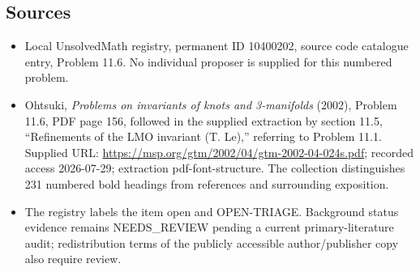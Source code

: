 \documentclass[11pt]{article}
\begin{document}
\subsection{Sources}
\begin{itemize}
\item Local UnsolvedMath registry, permanent ID 10400202, source code catalogue entry, Problem 11.6. No individual proposer is supplied for this numbered problem.
\item Ohtsuki, \emph{Problems on invariants of knots and 3-manifolds} (2002), Problem 11.6, PDF page 156, followed in the supplied extraction by section 11.5, ``Refinements of the LMO invariant (T. Le),'' referring to Problem 11.1. Supplied URL: \url{https://msp.org/gtm/2002/04/gtm-2002-04-024s.pdf}; recorded access 2026-07-29; extraction pdf-font-structure. The collection distinguishes 231 numbered bold headings from references and surrounding exposition.
\item The registry labels the item open and OPEN-TRIAGE. Background status evidence remains NEEDS\_REVIEW pending a current primary-literature audit; redistribution terms of the publicly accessible author/publisher copy also require review.
\end{itemize}
\end{document}
